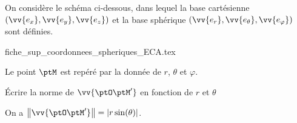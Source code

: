 
\finEntrainement




\newpage


\hauteurLargeurCadreReponse		{8mm}{4cm}
\initialisationEntrainement


 On considère le schéma ci-dessous, dans lequel la base cartésienne $(\vv{e_x},\vv{e_y},\vv{e_z})$ 
et la base sphérique $(\vv{e_r},\vv{e_\theta},\vv{e_\varphi})$
  sont définies.


\begin{center}
	{fiche_sup_coordonnees_spheriques_ECA.tex}
\end{center}


  Le point $\ptM$ est repéré par la donnée de $r$, $\theta$ et $\varphi$.


\debutEntrainement



\begin{enonce}
	Écrire la norme de $\vv{\ptO \ptM'}$ en fonction de $r$ et $\theta$
\end{enonce}


\begin{corrige}
	On a $\big\|\vv{\ptO \ptM'}\big\|=\left|r\sin(\theta)\right|$.
\end{corrige}

